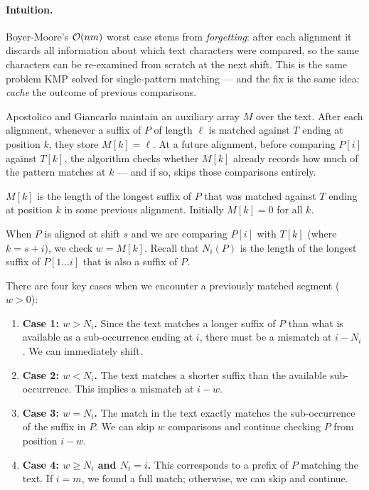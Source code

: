 \paragraph{Intuition.}
Boyer-Moore's $\mathcal{O}\!\left(nm\right)$ worst case stems from \emph{forgetting}: after each
alignment it discards all information about which text characters were compared,
so the same characters can be re-examined from scratch at the next shift.
This is the same problem KMP solved for single-pattern matching --- and the fix
is the same idea: \emph{cache} the outcome of previous comparisons.

Apostolico and Giancarlo maintain an auxiliary array $M$ over the text.
After each alignment, whenever a suffix of $P$ of length $\ell$ is matched
against $T$ ending at position $k$, they store $M[k] = \ell$.
At a future alignment, before comparing $P[i]$ against $T[k]$, the algorithm
checks whether $M[k]$ already records how much of the pattern matches at $k$ ---
and if so, skips those comparisons entirely.

\begin{definition}[$M$ array]
  $M[k]$ is the length of the longest suffix of $P$ that was matched against $T$
  ending at position $k$ in some previous alignment. Initially $M[k] = 0$ for all $k$.
\end{definition}

When $P$ is aligned at shift $s$ and we are comparing $P[i]$ with $T[k]$ (where $k = s+i$),
we check $w = M[k]$. Recall that $N_i(P)$ is the length of the longest suffix of $P[1\dots i]$
that is also a suffix of $P$.

There are four key cases when we encounter a previously matched segment ($w > 0$):
\begin{enumerate}
  \item \textbf{Case 1: $w > N_i$.} Since the text matches a longer suffix of $P$ than what is available as a sub-occurrence ending at $i$, there must be a mismatch at $i - N_i$. We can immediately shift.
  \item \textbf{Case 2: $w < N_i$.} The text matches a shorter suffix than the available sub-occurrence. This implies a mismatch at $i - w$.
  \item \textbf{Case 3: $w = N_i$.} The match in the text exactly matches the sub-occurrence of the suffix in $P$. We can skip $w$ comparisons and continue checking $P$ from position $i - w$.
  \item \textbf{Case 4: $w \ge N_i$ and $N_i = i$.} This corresponds to a prefix of $P$ matching the text. If $i=m$, we found a full match; otherwise, we can skip and continue.
\end{enumerate}

